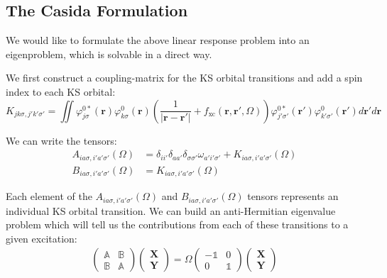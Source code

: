 \subsection{The Casida Formulation}
We would like to formulate the above linear response problem into an eigenproblem, which is solvable in a direct way.

We first construct a coupling-matrix for the KS orbital transitions and add a spin index to each KS orbital:
\begin{equation}
    K_{jk\sigma,j'k'\sigma'} = \iint \varphi^{0*}_{j\sigma}(\bm{r})\varphi^0_{k\sigma}(\bm{r})
    \left(\frac{1}{|\bm{r} -\bm{r}'|} + f_{\text{xc}}(\bm{r},\bm{r}',\Omega) \right)
    \varphi^{0*}_{j'\sigma'}(\bm{r}')\varphi^0_{k'\sigma'}(\bm{r}')
    d\bm{r}' d\bm{r}
\end{equation}

We can write the tensors:
\begin{equation}
    \begin{split}
        A_{ia\sigma,i'a'\sigma'}(\Omega) &= \delta_{ii'}\delta_{aa'}\delta_{\sigma\sigma'}\omega_{a'i'\sigma'} + K_{ia\sigma,i'a'\sigma'}(\Omega)\\
        B_{ia\sigma,i'a'\sigma'}(\Omega) &= K_{ia\sigma,i'a'\sigma'}(\Omega)
    \end{split}
\end{equation}

Each element of the $A_{ia\sigma,i'a'\sigma'}(\Omega)$ and $B_{ia\sigma,i'a'\sigma'}(\Omega)$ tensors represents an individual KS orbital transition. We can build an anti-Hermitian eigenvalue problem which will tell us the contributions from each of these transitions to a given excitation:
\begin{gather}
    \begin{pmatrix}
    \mathbb{A}&\mathbb{B}\\
    \mathbb{B}&\mathbb{A}
    \end{pmatrix}
    \begin{pmatrix}
    \bm{X}\\
    \bm{Y}
    \end{pmatrix}
    =
    \Omega
    \begin{pmatrix}
     - \mathbb{1}&0\\
    0&\mathbb{1}
    \end{pmatrix} 
    \begin{pmatrix}
    \bm{X}\\
    \bm{Y}
    \end{pmatrix}
\end{gather}

